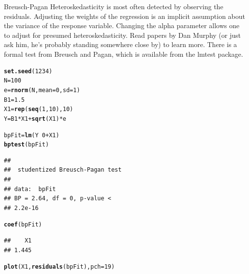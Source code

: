 \documentclass[xcolor=dvipsnames]{beamer}\usepackage{graphicx, color}
\makeatletter
\newcommand{\hlfunctioncall}[1]{\textcolor[rgb]{0.501960784313725,0,0.329411764705882}{\textbf{#1}}}%
\newenvironment{kframe}{%
 \def\at@end@of@kframe{}%
 \ifinner\ifhmode%
  \def\at@end@of@kframe{\end{minipage}}%
  \begin{minipage}{\columnwidth}%
 \fi\fi%
 \def\FrameCommand##1{\hskip\@totalleftmargin \hskip-\fboxsep
 \colorbox{shadecolor}{##1}\hskip-\fboxsep
     \hskip-\linewidth \hskip-\@totalleftmargin \hskip\columnwidth}%
 \MakeFramed {\advance\hsize-\width
   \@totalleftmargin\z@ \linewidth\hsize
   \@setminipage}}%
 {\par\unskip\endMakeFramed%
 \at@end@of@kframe}
\newenvironment{knitrout}{}{} %
\makeatother
\begin{document}
\begin{frame}[fragile]{Breusch-Pagan}
Heteroskedasticity is most often detected by observing the residuals. Adjusting the weights of the regression is an implicit assumption about the variance of the response variable. Changing the alpha parameter allows one to adjust for presumed heteroskedasticity. Read papers by Dan Murphy (or just ask him, he's probably standing somewhere close by) to learn more.
\newline There is a formal test from Breusch and Pagan, which is available from the lmtest package.
\end{frame}

\begin{frame}[fragile]
\begin{knitrout}
\color{fgcolor}\begin{kframe}
\begin{alltt}
\hlfunctioncall{set.seed}(1234)
N = 100
e = \hlfunctioncall{rnorm}(N, mean = 0, sd = 1)
B1 = 1.5
X1 = \hlfunctioncall{rep}(\hlfunctioncall{seq}(1, 10), 10)
Y = B1 * X1 + \hlfunctioncall{sqrt}(X1) * e

bpFit = \hlfunctioncall{lm}(Y ~ 0 + X1)
\hlfunctioncall{bptest}(bpFit)
\end{alltt}
\begin{verbatim}
## 
## 	studentized Breusch-Pagan test
## 
## data:  bpFit
## BP = 2.64, df = 0, p-value <
## 2.2e-16
\end{verbatim}
\begin{alltt}
\hlfunctioncall{coef}(bpFit)
\end{alltt}
\begin{verbatim}
##    X1 
## 1.445
\end{verbatim}
\end{kframe}
\end{knitrout}

\begin{knitrout}
\color{fgcolor}\begin{kframe}
\begin{alltt}
\hlfunctioncall{plot}(X1, \hlfunctioncall{residuals}(bpFit), pch = 19)
\end{alltt}
\end{kframe}
\end{knitrout}

\end{frame}
\end{document}
